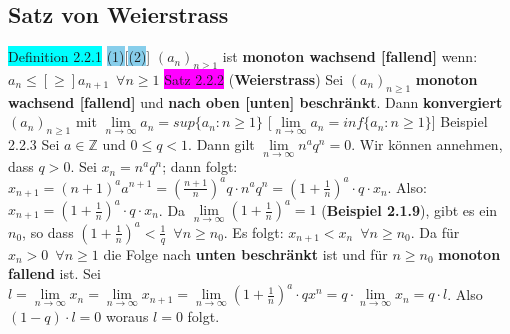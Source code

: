 \documentclass[landscape, 10pt]{article}
\begin{document}
\begin{multicols}{3}
\subsection{Satz von Weierstrass}
\colorbox{cyan}{Definition 2.2.1} \enspace \colorbox{SkyBlue}{(1)}[\colorbox{SkyBlue}{(2)}] 
                $(a_n)_{n\geqslant 1}$ ist \textbf{monoton
                wachsend [fallend]} wenn: \textcolor{NavyBlue}{
                $a_n\leqslant[\geqslant]a_{n+1}\enspace\forall n\geqslant1$}
\colorbox{magenta}{Satz 2.2.2} (\textbf{Weierstrass}) Sei 
                \textcolor{NavyBlue}{$(a_n)_{n\geqslant 1}$}
                \textbf{monoton wachsend 
                [fallend]} und \textbf{nach oben [unten] beschränkt}. Dann 
         \textbf{konvergiert} 
                \textcolor{NavyBlue}{$(a_n)_{n\geqslant 1}$} mit 
                \textcolor{NavyBlue}{$\lim\limits_{n\to\infty}a_n=sup\{a_n:n\geqslant 1\}$}
                [\textcolor{NavyBlue}{$\lim\limits_{n\to\infty}a_n=inf\{a_n:n\geqslant 1\}$}]
\colorbox{Dandelion}{Beispiel 2.2.3} Sei \textcolor{NavyBlue}{$a\in\mathbb{Z}$} und 
                \textcolor{NavyBlue}{$0\leqslant q<1$}.
                Dann gilt \textcolor{NavyBlue}{$\lim\limits_{n\to\infty}n^aq^n=0$}.
                Wir können annehmen, dass \textcolor{NavyBlue}{$q>0$}. Sei 
                \textcolor{NavyBlue}{$x_n=n^aq^n$}; dann folgt:
                \textcolor{NavyBlue}{$x_{n+1}=(n+1)^aa^{n+1}=(\frac{n+1}{n})^aq\cdot n^aq^n
                =(1+\frac{1}{n})^a\cdot q\cdot x_n$}. Also:
                \textcolor{NavyBlue}{$x_{n+1}=(1+\frac{1}{n})^a\cdot q\cdot x_n$}. 
                Da \textcolor{NavyBlue}{$\lim\limits_{n\to\infty}(1+\frac{1}{n})^a=1$}
                (\textbf{Beispiel 2.1.9}), gibt es ein \textcolor{NavyBlue}{$n_0$}, so dass
                \textcolor{NavyBlue}{
                $(1+\frac{1}{n})^a<\frac{1}{q}\enspace\forall n\geqslant n_0$}.
                Es folgt: 
                \textcolor{NavyBlue}{$x_{n+1}<x_n\enspace\forall n\geqslant n_0$}. 
                Da für \textcolor{NavyBlue}{$x_n>0\enspace\forall n\geqslant1$} 
                die Folge nach \textbf{unten beschränkt} ist und für 
                \textcolor{NavyBlue}{$n\geqslant n_0$} \textbf{monoton
                fallend} ist.
                Sei \textcolor{NavyBlue}{$l=\lim\limits_{n\to\infty}x_n
                =\lim\limits_{n\to\infty}x_{n+1}
                =\lim\limits_{n\to\infty}(1+\frac{1}{n})^a\cdot qx^n
                =q\cdot\lim\limits_{n\to\infty}x_n=q\cdot l$}.
                Also \textcolor{NavyBlue}{$(1-q)\cdot l=0$} woraus 
                \textcolor{NavyBlue}{$l=0$} folgt.

\end{multicols}
\end{document}
